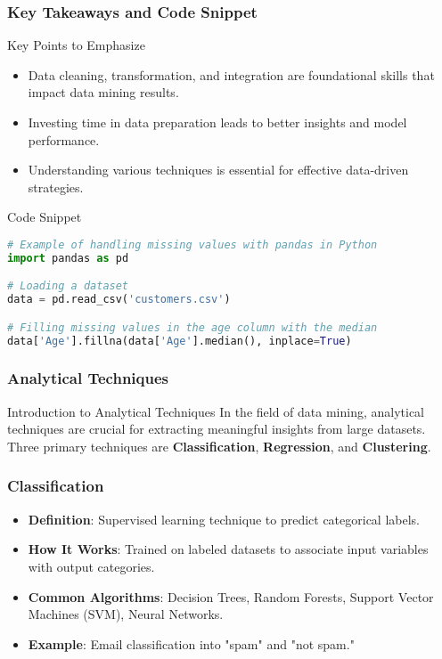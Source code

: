\documentclass{beamer}
\begin{document}
\begin{frame}[fragile]
    \frametitle{Key Takeaways and Code Snippet}
    
    \begin{block}{Key Points to Emphasize}
        \begin{itemize}
            \item Data cleaning, transformation, and integration are foundational skills that impact data mining results.
            \item Investing time in data preparation leads to better insights and model performance.
            \item Understanding various techniques is essential for effective data-driven strategies.
        \end{itemize}
    \end{block}
    
    \begin{block}{Code Snippet}
        \begin{lstlisting}[language=Python]
# Example of handling missing values with pandas in Python
import pandas as pd

# Loading a dataset
data = pd.read_csv('customers.csv')

# Filling missing values in the age column with the median
data['Age'].fillna(data['Age'].median(), inplace=True)
        \end{lstlisting}
    \end{block}
\end{frame}

\begin{frame}[fragile]
    \frametitle{Analytical Techniques}
    \begin{block}{Introduction to Analytical Techniques}
        In the field of data mining, analytical techniques are crucial for extracting meaningful insights from large datasets. Three primary techniques are \textbf{Classification}, \textbf{Regression}, and \textbf{Clustering}.
    \end{block}
\end{frame}

\begin{frame}[fragile]
    \frametitle{Classification}
    \begin{itemize}
        \item \textbf{Definition}: Supervised learning technique to predict categorical labels.
        \item \textbf{How It Works}: Trained on labeled datasets to associate input variables with output categories.
        \item \textbf{Common Algorithms}: Decision Trees, Random Forests, Support Vector Machines (SVM), Neural Networks.
        \item \textbf{Example}: Email classification into "spam" and "not spam."
    \end{itemize}
\end{frame}
\end{document}
